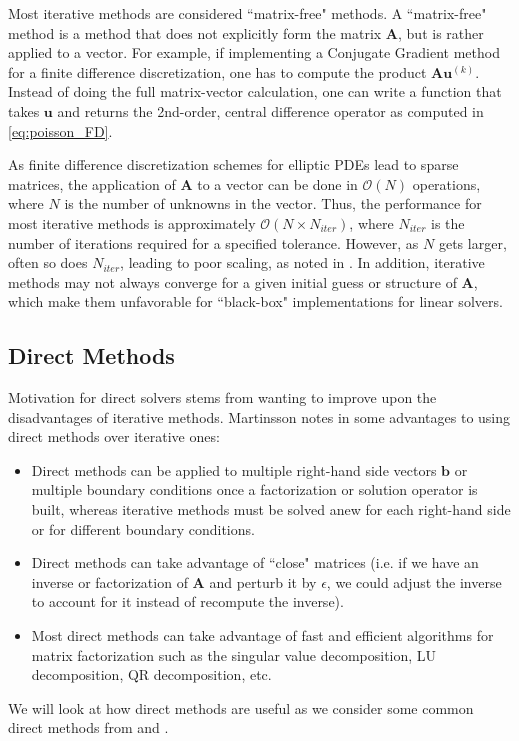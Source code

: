 Most iterative methods are considered ``matrix-free" methods. A ``matrix-free" method is a method that does not explicitly form the matrix $\textbf{A}$, but is rather applied to a vector. For example, if implementing a Conjugate Gradient method for a finite difference discretization, one has to compute the product $\textbf{A} \textbf{u}^{(k)}$. Instead of doing the full matrix-vector calculation, one can write a function that takes $\textbf{u}$ and returns the 2nd-order, central difference operator as computed in \ref{eq:poisson_FD}.

As finite difference discretization schemes for elliptic PDEs lead to sparse matrices, the application of $\textbf{A}$ to a vector can be done in $\mathcal{O}(N)$ operations, where $N$ is the number of unknowns in the vector. Thus, the performance for most iterative methods is approximately $\mathcal{O}(N \times N_{iter})$, where $N_{iter}$ is the number of iterations required for a specified tolerance. However, as $N$ gets larger, often so does $N_{iter}$, leading to poor scaling, as noted in \citep{martinsson2019fast}. In addition, iterative methods may not always converge for a given initial guess or structure of $\textbf{A}$, which make them unfavorable for ``black-box" implementations for linear solvers.

\subsection{Direct Methods}
\label{sub:direct-methods}

Motivation for direct solvers stems from wanting to improve upon the disadvantages of iterative methods. Martinsson notes in \citep{martinsson2004fast} some advantages to using direct methods over iterative ones:
\begin{itemize}
    \item Direct methods can be applied to multiple right-hand side vectors $\textbf{b}$ or multiple boundary conditions once a factorization or solution operator is built, whereas iterative methods must be solved anew for each right-hand side or for different boundary conditions.

    \item Direct methods can take advantage of ``close" matrices (i.e. if we have an inverse or factorization of $\textbf{A}$ and perturb it by $\epsilon$, we could adjust the inverse to account for it instead of recompute the inverse).

    \item Most direct methods can take advantage of fast and efficient algorithms for matrix factorization such as the singular value decomposition, LU decomposition, QR decomposition, etc.
\end{itemize}
We will look at how direct methods are useful as we consider some common direct methods from \citep{leveque2007finite} and \citep{trefethen1997numerical}.

